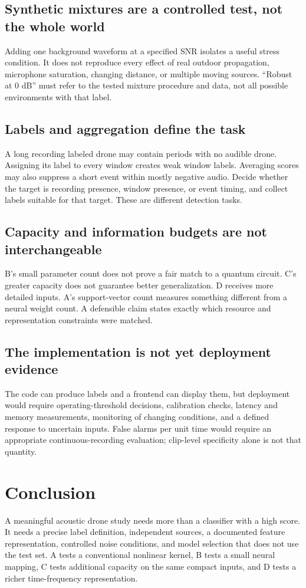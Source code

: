 \documentclass[11pt,letterpaper]{article}
\begin{document}
\subsection{Synthetic mixtures are a controlled test, not the whole world}
Adding one background waveform at a specified SNR isolates a useful stress
condition. It does not reproduce every effect of real outdoor propagation,
microphone saturation, changing distance, or multiple moving sources.
``Robust at 0 dB'' must refer to the tested mixture procedure and data, not all
possible environments with that label.

\subsection{Labels and aggregation define the task}
A long recording labeled drone may contain periods with no audible drone.
Assigning its label to every window creates weak window labels. Averaging
scores may also suppress a short event within mostly negative audio. Decide
whether the target is recording presence, window presence, or event timing,
and collect labels suitable for that target. These are different detection tasks.

\subsection{Capacity and information budgets are not interchangeable}
B's small parameter count does not prove a fair match to a quantum circuit.
C's greater capacity does not guarantee better generalization. D receives
more detailed inputs. A's support-vector count measures something different
from a neural weight count. A defensible claim states exactly which resource
and representation constraints were matched.

\subsection{The implementation is not yet deployment evidence}
The code can produce labels and a frontend can display them, but deployment
would require operating-threshold decisions, calibration checks, latency and
memory measurements, monitoring of changing conditions, and a defined
response to uncertain inputs. False alarms per unit time would require an
appropriate continuous-recording evaluation; clip-level specificity alone is
not that quantity.

\section{Conclusion}
A meaningful acoustic drone study needs more than a classifier with a high
score. It needs a precise label definition, independent sources, a documented
feature representation, controlled noise conditions, and model selection that
does not use the test set. A tests a conventional nonlinear kernel, B tests a
small neural mapping, C tests additional capacity on the same compact inputs,
and D tests a richer time-frequency representation.
\end{document}
